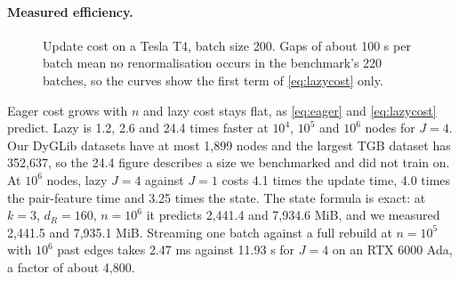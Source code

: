 \documentclass[11pt,a4paper]{article}
\theoremstyle{plain}
\theoremstyle{definition}
\begin{document}
\paragraph{Measured efficiency.}
\begin{figure}[H]\centering
{}
\caption{Update cost on a Tesla T4, batch size 200. Gaps of about 100 s per batch mean no renormalisation occurs in the benchmark's 220 batches, so the curves show the first term of \eqref{eq:lazycost} only.}\label{fig:lazy}
\end{figure}
Eager cost grows with $n$ and lazy cost stays flat, as \eqref{eq:eager} and \eqref{eq:lazycost} predict. Lazy is 1.2, 2.6 and 24.4 times faster at $10^4$, $10^5$ and $10^6$ nodes for $J=4$. Our DyGLib datasets have at most 1,899 nodes and the largest TGB dataset has 352,637, so the 24.4 figure describes a size we benchmarked and did not train on. At $10^6$ nodes, lazy $J=4$ against $J=1$ costs 4.1 times the update time, 4.0 times the pair-feature time and 3.25 times the state. The state formula is exact: at $k=3$, $d_R=160$, $n=10^6$ it predicts 2,441.4 and 7,934.6 MiB, and we measured 2,441.5 and 7,935.1 MiB. Streaming one batch against a full rebuild at $n=10^5$ with $10^6$ past edges takes 2.47 ms against 11.93 s for $J=4$ on an RTX 6000 Ada, a factor of about 4,800.
\end{document}
